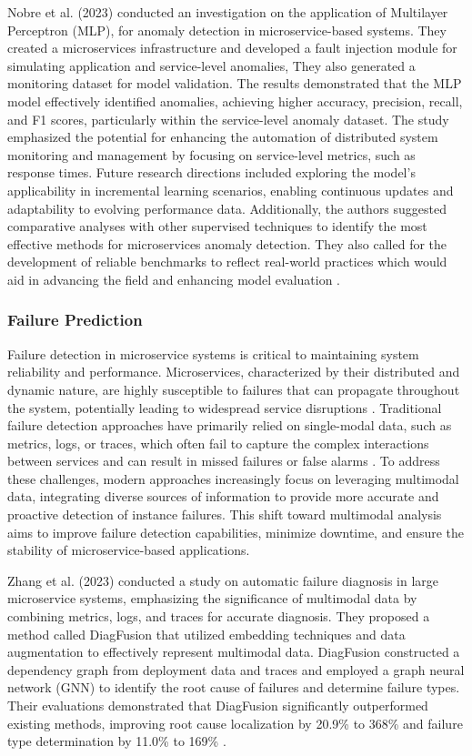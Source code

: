 \documentclass[10pt,journal,compsoc]{IEEEtran}
\begin{document}
Nobre et al. (2023) conducted an investigation on the application of Multilayer Perceptron (MLP), for anomaly detection in microservice-based systems. They created a microservices infrastructure and developed a fault injection module for simulating application and service-level anomalies, They also generated  a monitoring dataset for model validation. The results demonstrated that the MLP model effectively identified anomalies, achieving higher accuracy, precision, recall, and F1 scores, particularly within the service-level anomaly dataset. The study emphasized the potential for enhancing the automation of distributed system monitoring and management by focusing on service-level metrics, such as response times. Future research directions included exploring the model's applicability in incremental learning scenarios, enabling continuous updates and adaptability to evolving performance data. Additionally, the authors suggested comparative analyses with other supervised techniques to identify the most effective methods for microservices anomaly detection. They also called for the development of reliable benchmarks to reflect real-world practices which would aid in advancing the field and enhancing model evaluation \cite{nobre2023anomaly}.

\subsubsection{Failure Prediction}
Failure detection in microservice systems is critical to maintaining system reliability and performance. Microservices, characterized by their distributed and dynamic nature, are highly susceptible to failures that can propagate throughout the system, potentially leading to widespread service disruptions \cite{mazraemolla2024effective}. Traditional failure detection approaches have primarily relied on single-modal data, such as metrics, logs, or traces, which often fail to capture the complex interactions between services and can result in missed failures or false alarms \cite{wang2024madmm}. To address these challenges, modern approaches increasingly focus on leveraging multimodal data, integrating diverse sources of information to provide more accurate and proactive detection of instance failures. This shift toward multimodal analysis aims to improve failure detection capabilities, minimize downtime, and ensure the stability of microservice-based applications.

Zhang et al. (2023) conducted a study on automatic failure diagnosis in large microservice systems, emphasizing the significance of multimodal data by combining metrics, logs, and traces for accurate diagnosis. They proposed a method called DiagFusion that utilized embedding techniques and data augmentation to effectively represent multimodal data. DiagFusion constructed a dependency graph from deployment data and traces and employed a graph neural network (GNN) to identify the root cause of failures and determine failure types. Their evaluations demonstrated that DiagFusion significantly outperformed existing methods, improving root cause localization by 20.9\% to 368\% and failure type determination by 11.0\% to 169\% \cite{zhang2023robust}.
\end{document}
